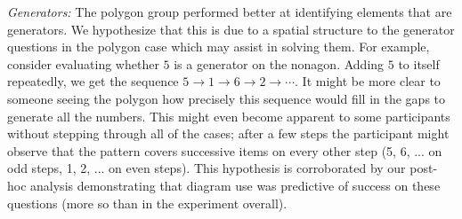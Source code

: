 \documentclass[man,10pt]{apa6}
\begin{document}
\textit{Generators:} The polygon group performed better at identifying elements that are generators. We hypothesize that this is due to a spatial structure to the generator questions in the polygon case which may assist in solving them. For example, consider evaluating whether $5$ is a generator on the nonagon. Adding $5$ to itself repeatedly, we get the sequence $5 \rightarrow 1 \rightarrow 6 \rightarrow 2 \rightarrow \cdots$. It might be more clear to someone seeing the polygon how precisely this sequence would fill in the gaps to generate all the numbers. This might even become apparent to some participants without stepping through all of the cases; after a few steps the participant might observe that the pattern covers successive items on every other step (5, 6, ... on odd steps, 1, 2, ... on even steps). This hypothesis is corroborated by our post-hoc analysis demonstrating that diagram use was predictive of success on these questions (more so than in the experiment overall). 
\end{document}
